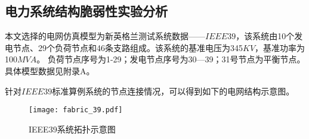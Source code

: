 \subsection{电力系统结构脆弱性实验分析}
\label{sec:singleAnalysis_fabric}
本文选择的电网仿真模型为新英格兰测试系统数据——$IEEE39$，该系统由10个发电节点、29个负荷节点和46条支路组成。该系统的基准电压为345$KV$，基准功率为100$MVA$。
负荷节点序号为1-29；发电节点序号为30—39；31号节点为平衡节点。具体模型数据见附录A。

针对$IEEE39$标准算例系统的节点连接情况，可以得到如下的电网结构示意图。
\begin{figure}[H] %
  \centering
  \texttt{[image: fabric\_39.pdf]}
  \caption{IEEE39系统拓扑示意图}
  \label{fig:fabric_39}
\end{figure}

